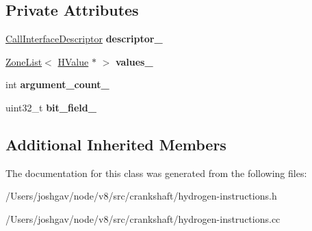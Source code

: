\subsection*{Private Attributes}
\begin{DoxyCompactItemize}
\item 
\hyperlink{classv8_1_1internal_1_1_call_interface_descriptor}{Call\+Interface\+Descriptor} {\bfseries descriptor\+\_\+}\hypertarget{classv8_1_1internal_1_1_h_call_with_descriptor_a5728d6a4ddf1763aa141b816c7d31aad}{}\label{classv8_1_1internal_1_1_h_call_with_descriptor_a5728d6a4ddf1763aa141b816c7d31aad}

\item 
\hyperlink{classv8_1_1internal_1_1_zone_list}{Zone\+List}$<$ \hyperlink{classv8_1_1internal_1_1_h_value}{H\+Value} $\ast$ $>$ {\bfseries values\+\_\+}\hypertarget{classv8_1_1internal_1_1_h_call_with_descriptor_a8e29f40a650dbdbc55d1da15daa98102}{}\label{classv8_1_1internal_1_1_h_call_with_descriptor_a8e29f40a650dbdbc55d1da15daa98102}

\item 
int {\bfseries argument\+\_\+count\+\_\+}\hypertarget{classv8_1_1internal_1_1_h_call_with_descriptor_ab4aa98df6bbb47af4c0371f98f508aa5}{}\label{classv8_1_1internal_1_1_h_call_with_descriptor_ab4aa98df6bbb47af4c0371f98f508aa5}

\item 
uint32\+\_\+t {\bfseries bit\+\_\+field\+\_\+}\hypertarget{classv8_1_1internal_1_1_h_call_with_descriptor_aa2c29626c2478d0bb06394301e964e1f}{}\label{classv8_1_1internal_1_1_h_call_with_descriptor_aa2c29626c2478d0bb06394301e964e1f}

\end{DoxyCompactItemize}
\subsection*{Additional Inherited Members}


The documentation for this class was generated from the following files\+:\begin{DoxyCompactItemize}
\item 
/\+Users/joshgav/node/v8/src/crankshaft/hydrogen-\/instructions.\+h\item 
/\+Users/joshgav/node/v8/src/crankshaft/hydrogen-\/instructions.\+cc\end{DoxyCompactItemize}
